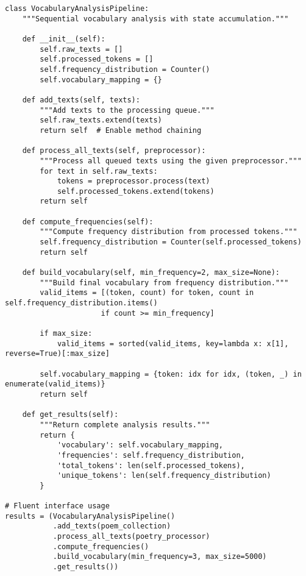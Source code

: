 \documentclass[11pt,a4paper]{article}
\begin{document}
\begin{lstlisting}[caption=Pipeline classes for stateful processing]
class VocabularyAnalysisPipeline:
    """Sequential vocabulary analysis with state accumulation."""
    
    def __init__(self):
        self.raw_texts = []
        self.processed_tokens = []
        self.frequency_distribution = Counter()
        self.vocabulary_mapping = {}
    
    def add_texts(self, texts):
        """Add texts to the processing queue."""
        self.raw_texts.extend(texts)
        return self  # Enable method chaining
    
    def process_all_texts(self, preprocessor):
        """Process all queued texts using the given preprocessor."""
        for text in self.raw_texts:
            tokens = preprocessor.process(text)
            self.processed_tokens.extend(tokens)
        return self
    
    def compute_frequencies(self):
        """Compute frequency distribution from processed tokens."""
        self.frequency_distribution = Counter(self.processed_tokens)
        return self
    
    def build_vocabulary(self, min_frequency=2, max_size=None):
        """Build final vocabulary from frequency distribution."""
        valid_items = [(token, count) for token, count in self.frequency_distribution.items() 
                      if count >= min_frequency]
        
        if max_size:
            valid_items = sorted(valid_items, key=lambda x: x[1], reverse=True)[:max_size]
        
        self.vocabulary_mapping = {token: idx for idx, (token, _) in enumerate(valid_items)}
        return self
    
    def get_results(self):
        """Return complete analysis results."""
        return {
            'vocabulary': self.vocabulary_mapping,
            'frequencies': self.frequency_distribution,
            'total_tokens': len(self.processed_tokens),
            'unique_tokens': len(self.frequency_distribution)
        }

# Fluent interface usage
results = (VocabularyAnalysisPipeline()
           .add_texts(poem_collection)
           .process_all_texts(poetry_processor)
           .compute_frequencies()
           .build_vocabulary(min_frequency=3, max_size=5000)
           .get_results())
\end{lstlisting}
\end{document}
